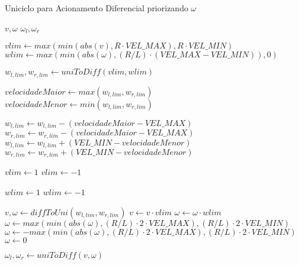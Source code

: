 \begin{frame}
	\begin{algorithm}[H]
		\scriptsize
		\caption{Uniciclo para Acionamento Diferencial priorizando $\omega$}
		\begin{algorithmic}[1]
			\REQUIRE $v, \omega$
			\ENSURE $\omega_l, \omega_r$
			
				\STATE $vlim \leftarrow max(min(abs(v), R \cdot VEL\_MAX), R \cdot VEL\_MIN)$
				\STATE $wlim \leftarrow max(min(abs(\omega), (R/L) \cdot (VEL\_MAX - VEL\_MIN)), 0)$
				
				\STATE $w_{l,lim}, w_{r,lim} \leftarrow uniToDiff(vlim, wlim)$
				
				\STATE $ velocidadeMaior \leftarrow max(w_{l,lim}, w_{r,lim})$
				\STATE $ velocidadeMenor \leftarrow min(w_{l,lim}, w_{r,lim})$
			
					\STATE $w_{l,lim} \leftarrow w_{l,lim} - (velocidadeMaior - VEL\_MAX)$
					\STATE $w_{r,lim} \leftarrow w_{r,lim} - (velocidadeMaior - VEL\_MAX)$
					\STATE $w_{l,lim} \leftarrow w_{l,lim} + (VEL\_MIN - velocidadeMenor)$
					\STATE $w_{r,lim} \leftarrow w_{r,lim} + (VEL\_MIN - velocidadeMenor)$
				\ENDIF
				
					\STATE $vlim \leftarrow 1$
				\ELSE
					\STATE $vlim \leftarrow -1$
				\ENDIF
				
				\vspace{-6.5cm}
					\STATE $wlim \leftarrow 1$
				\ELSE
					\STATE $wlim \leftarrow -1$
				\ENDIF
					
				\STATE $v,\omega \leftarrow diffToUni(w_{l,lim},w_{r,lim})$
				\STATE $v \leftarrow v \cdot vlim$
				\STATE $\omega \leftarrow \omega \cdot wlim$
			\ELSE
						\STATE $\omega \leftarrow max(min(abs(\omega),(R/L) \cdot 2 \cdot VEL\_MAX),(R/L) \cdot 2 \cdot VEL\_MIN)$ 
					\ELSE
						\STATE $\omega \leftarrow -max(min(abs(\omega),(R/L) \cdot 2 \cdot VEL\_MAX),(R/L) \cdot 2 \cdot VEL\_MIN)$
					\ENDIF
				\ELSE
					\STATE $\omega \leftarrow 0$
				\ENDIF
			\ENDIF
				
			\STATE $\omega_l, \omega_r \leftarrow uniToDiff(v,\omega)$
		\end{algorithmic}
	\end{algorithm}
\end{frame}

